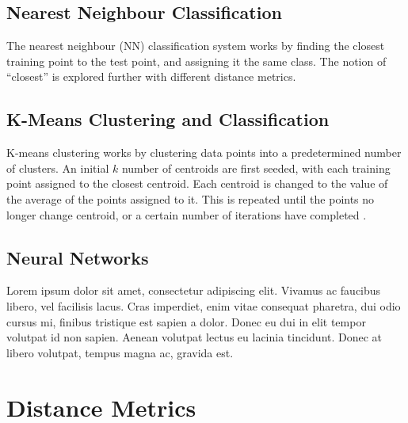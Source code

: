 \documentclass[a4paper, 10pt, conference]{ieeeconf}
\begin{document}
\subsection{Nearest Neighbour Classification}
The nearest neighbour (NN) classification system works by finding the closest training point to the test point, and assigning it the same class. The notion of ``closest'' is explored further with different distance metrics.
\subsection{K-Means Clustering and Classification}
K-means clustering works by clustering data points into a predetermined number of clusters. An initial $k$ number of centroids are first seeded, with each training point assigned to the closest centroid. Each centroid is changed to the value of the average of the points assigned to it. This is repeated until the points no longer change centroid, or a certain number of iterations have completed \cite{kmeans}.
\subsection{Neural Networks}
Lorem ipsum dolor sit amet, consectetur adipiscing elit. Vivamus ac faucibus libero, vel facilisis lacus. Cras imperdiet, enim vitae consequat pharetra, dui odio cursus mi, finibus tristique est sapien a dolor. Donec eu dui in elit tempor volutpat id non sapien. Aenean volutpat lectus eu lacinia tincidunt. Donec at libero volutpat, tempus magna ac, gravida est.

\section{Distance Metrics}
\end{document}

